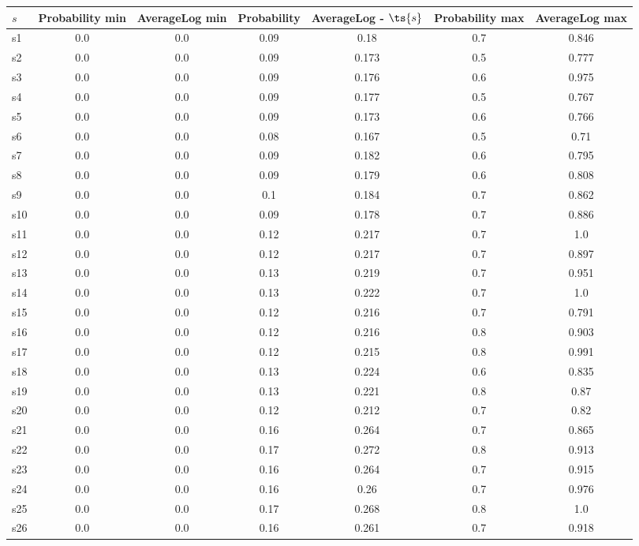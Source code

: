 \documentclass{article}
\begin{document}
\noindent\begin{tabular}{|l|c|c|c|c|c|c|}
\hline
$s$& Probability min & AverageLog min & Probability & AverageLog - $\ts{s}$ & Probability max & AverageLog max\\
\hline
s1 &0.0 & 0.0 & 0.09 & 0.18 & 0.7 & 0.846\\
\hline
s2 &0.0 & 0.0 & 0.09 & 0.173 & 0.5 & 0.777\\
\hline
s3 &0.0 & 0.0 & 0.09 & 0.176 & 0.6 & 0.975\\
\hline
s4 &0.0 & 0.0 & 0.09 & 0.177 & 0.5 & 0.767\\
\hline
s5 &0.0 & 0.0 & 0.09 & 0.173 & 0.6 & 0.766\\
\hline
s6 &0.0 & 0.0 & 0.08 & 0.167 & 0.5 & 0.71\\
\hline
s7 &0.0 & 0.0 & 0.09 & 0.182 & 0.6 & 0.795\\
\hline
s8 &0.0 & 0.0 & 0.09 & 0.179 & 0.6 & 0.808\\
\hline
s9 &0.0 & 0.0 & 0.1 & 0.184 & 0.7 & 0.862\\
\hline
s10 &0.0 & 0.0 & 0.09 & 0.178 & 0.7 & 0.886\\
\hline
s11 &0.0 & 0.0 & 0.12 & 0.217 & 0.7 & 1.0\\
\hline
s12 &0.0 & 0.0 & 0.12 & 0.217 & 0.7 & 0.897\\
\hline
s13 &0.0 & 0.0 & 0.13 & 0.219 & 0.7 & 0.951\\
\hline
s14 &0.0 & 0.0 & 0.13 & 0.222 & 0.7 & 1.0\\
\hline
s15 &0.0 & 0.0 & 0.12 & 0.216 & 0.7 & 0.791\\
\hline
s16 &0.0 & 0.0 & 0.12 & 0.216 & 0.8 & 0.903\\
\hline
s17 &0.0 & 0.0 & 0.12 & 0.215 & 0.8 & 0.991\\
\hline
s18 &0.0 & 0.0 & 0.13 & 0.224 & 0.6 & 0.835\\
\hline
s19 &0.0 & 0.0 & 0.13 & 0.221 & 0.8 & 0.87\\
\hline
s20 &0.0 & 0.0 & 0.12 & 0.212 & 0.7 & 0.82\\
\hline
s21 &0.0 & 0.0 & 0.16 & 0.264 & 0.7 & 0.865\\
\hline
s22 &0.0 & 0.0 & 0.17 & 0.272 & 0.8 & 0.913\\
\hline
s23 &0.0 & 0.0 & 0.16 & 0.264 & 0.7 & 0.915\\
\hline
s24 &0.0 & 0.0 & 0.16 & 0.26 & 0.7 & 0.976\\
\hline
s25 &0.0 & 0.0 & 0.17 & 0.268 & 0.8 & 1.0\\
\hline
s26 &0.0 & 0.0 & 0.16 & 0.261 & 0.7 & 0.918\\

\end{tabular}
\end{document}
